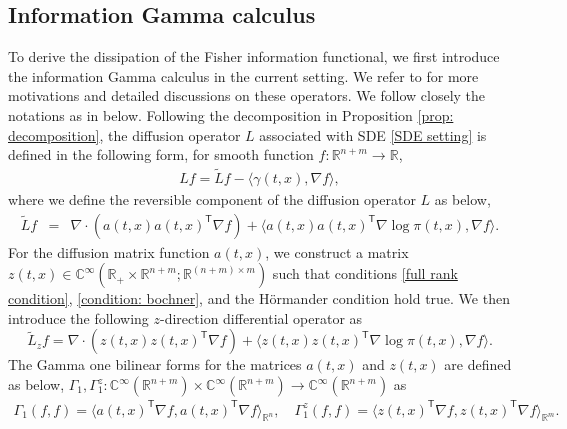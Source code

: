 \documentclass[11pt,reqno]{amsart}
\newcommand{\la}{\langle}
\newcommand{\ra}{\rangle}
\newcommand{\ts}{\mathsf{T}}
\newcommand{\bea}{\begin{eqnarray}}
\newcommand{\eea}{\end{eqnarray}}
\def\hR{\mathbb{R}}
\begin{document}
\subsection{Information Gamma calculus} To derive the dissipation of the Fisher information functional, we first introduce the information Gamma calculus in the current setting. We refer to \cite{FengLi, FengLi2021, BFL2022} for more motivations and detailed discussions on these operators. We follow closely the notations as in \cite[Definition 2]{FengLi2021} below. 
Following the decomposition in Proposition \ref{prop: decomposition}, the diffusion operator $L$ associated with SDE \eqref{SDE setting} is defined in the following form, for smooth function $f:\mathbb R^{n+m}\rightarrow\mathbb R$,  
\begin{equation}\label{operator L}
\begin{aligned}
Lf=\widetilde Lf -\la \gamma(t,x),\nabla f\ra,
\end{aligned}
\end{equation}
where we define the reversible component of the diffusion operator $L$ as below, 
\bea
\widetilde L f&=& \nabla\cdot(a(t,x)a(t,x)^{\ts}\nabla f)+\la a(t,x)a(t,x)^{\ts}\nabla \log\pi(t,x),\nabla f\ra.
\eea
For the diffusion matrix function $a(t,x)$, we construct a matrix $z(t,x)\in\mathbb C^{\infty}(\mathbb R_+\times \mathbb R^{n+m}; \mathbb R^{(n+m)\times m })$ such that conditions \eqref{full rank condition}, \eqref{condition: bochner}, and the H\"ormander condition hold true. We then introduce the following $z$-direction differential operator as
\begin{equation*}\label{z operator}
\widetilde L_z f=\nabla\cdot(z(t,x)z(t,x)^{\ts}\nabla f)+\la z(t,x)z(t,x)^{\ts}\nabla \log\pi(t,x),\nabla f\ra.   
\end{equation*}
The Gamma one bilinear forms for the matrices $a(t,x)$ and $z(t,x)$ are defined as below, $\Gamma_{1},\Gamma_{1}^z\colon \mathbb C^{\infty}(\mathbb{R}^{n+m})\times \mathbb C^{\infty}(\mathbb{R}^{n+m})\rightarrow \mathbb C^{\infty}(\mathbb{R}^{n+m})$ as 
\bea
\Gamma_{1}(f,f)=\la a(t,x)^{\ts}\nabla f, a(t,x)^{\ts}\nabla f\ra_{\hR^n},\quad \Gamma_{1}^z(f,f)=\la z(t,x)^{\ts}\nabla f, z(t,x)^{\ts}\nabla f\ra_{\hR^m}.
\eea
\end{document}
